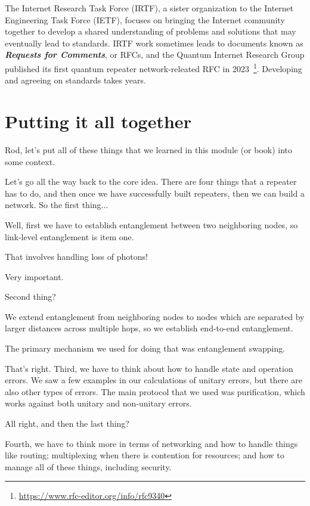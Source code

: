 The Internet Research Task Force (IRTF), a sister organization to the Internet Engineering Task Force (IETF), focuses on bringing the Internet community together to develop a shared understanding of problems and solutions that may eventually lead to standards. IRTF work sometimes leads to documents known as \textbf{\emph{Requests for Comments}}, or RFCs, and the Quantum Internet Research Group published its first quantum repeater network-releated RFC in 2023~\footnote{\url{https://www.rfc-editor.org/info/rfc9340}}.
Developing and agreeing on standards takes years.



\section{Putting it all together}
\label{sec:putting-it-all-together}


\mmm Rod, let's put all of these things that we learned in this module (or book) into some context.

\rrr Let's go all the way back to the core idea. There are four things that a repeater has to do, and then once we have  successfully built repeaters, then we can build a network. So the first thing...

\mmm Well, first we have to establish entanglement between two neighboring nodes, so link-level entanglement is item one.

\rrr That involves handling loss of photons!

\mmm Very important.

\rrr Second thing?

\mmm We extend entanglement from neighboring nodes to nodes which are separated by larger distances across multiple hops, so we establish end-to-end entanglement.

\rrr The primary mechanism we used for doing that was entanglement swapping. 

\mmm That's right.
Third, we have to think about how to handle state and operation errors. We saw a few examples in our calculations of unitary errors, but there are also other types of errors. The main protocol that we used was purification, which works against both unitary and non-unitary errors.

\rrr All right, and then the last thing?

\mmm Fourth, we have to think more in terms of networking and how to handle things like routing; multiplexing when there is contention for resources; and how to manage all of these things, including security.

